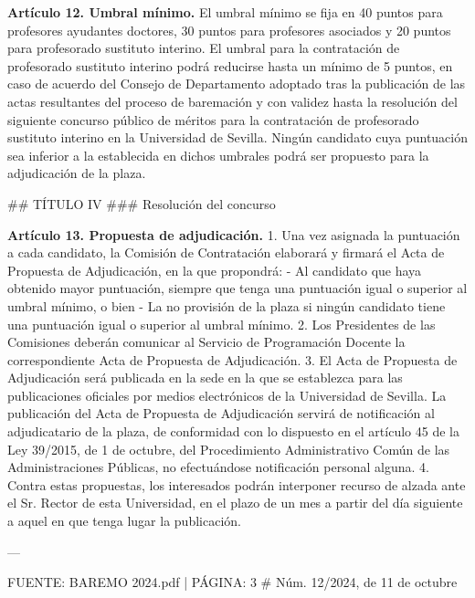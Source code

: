 \documentclass{article}
\begin{document}
\begin{itemize}
\begin{itemize}
\begin{scriptsize}
                  \textbf{Artículo 12. Umbral mínimo.}
                  El umbral mínimo se fija en 40 puntos para profesores ayudantes doctores, 30 puntos para profesores asociados y 20 puntos para profesorado sustituto interino.
                  El umbral para la contratación de profesorado sustituto interino podrá reducirse hasta un mínimo de 5 puntos, en caso de acuerdo del Consejo de Departamento adoptado tras la publicación de las actas resultantes del proceso de baremación y con validez hasta la resolución del siguiente concurso público de méritos para la contratación de profesorado sustituto interino en la Universidad de Sevilla. Ningún candidato cuya puntuación sea inferior a la establecida en dichos umbrales podrá ser propuesto para la adjudicación de la plaza.

                  \#\# TÍTULO IV
                  \#\#\# Resolución del concurso

                  \textbf{Artículo 13. Propuesta de adjudicación.}
                  1. Una vez asignada la puntuación a cada candidato, la Comisión de Contratación elaborará y firmará el Acta de Propuesta de Adjudicación, en la que propondrá:
                  - Al candidato que haya obtenido mayor puntuación, siempre que tenga una puntuación igual o superior al umbral mínimo, o bien
                  - La no provisión de la plaza si ningún candidato tiene una puntuación igual o superior al umbral mínimo.
                  2. Los Presidentes de las Comisiones deberán comunicar al Servicio de Programación Docente la correspondiente Acta de Propuesta de Adjudicación.
                  3. El Acta de Propuesta de Adjudicación será publicada en la sede en la que se establezca para las publicaciones oficiales por medios electrónicos de la Universidad de Sevilla. La publicación del Acta de Propuesta de Adjudicación servirá de notificación al adjudicatario de la plaza, de conformidad con lo dispuesto en el artículo 45 de la Ley 39/2015, de 1 de octubre, del Procedimiento Administrativo Común de las Administraciones Públicas, no efectuándose notificación personal alguna.
                  4. Contra estas propuestas, los interesados podrán interponer recurso de alzada ante el Sr. Rector de esta Universidad, en el plazo de un mes a partir del día siguiente a aquel en que tenga lugar la publicación.

                  ---

                  FUENTE: BAREMO 2024.pdf | PÁGINA: 3
                  \# Núm. 12/2024, de 11 de octubre


\end{scriptsize}
\end{itemize}
\end{itemize}
\end{document}
